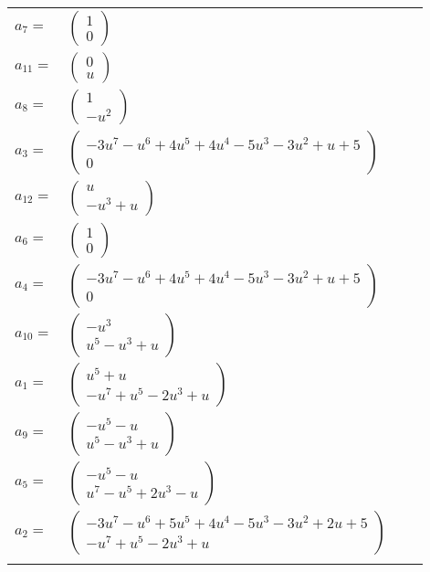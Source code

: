 \documentclass[1p]{elsarticle_modified}
\theoremstyle{definition}
\begin{document}
\begin{tabular}{m{7pt} m{180pt} m{7pt} m{180pt} }
\flushright $a_{7}=$&$\begin{pmatrix}1\\0\end{pmatrix}$ \\
\flushright $a_{11}=$&$\begin{pmatrix}0\\u\end{pmatrix}$ \\
\flushright $a_{8}=$&$\begin{pmatrix}1\\- u^2\end{pmatrix}$ \\
\flushright $a_{3}=$&$\begin{pmatrix}-3 u^7- u^6+4 u^5+4 u^4-5 u^3-3 u^2+u+5\\0\end{pmatrix}$ \\
\flushright $a_{12}=$&$\begin{pmatrix}u\\- u^3+u\end{pmatrix}$ \\
\flushright $a_{6}=$&$\begin{pmatrix}1\\0\end{pmatrix}$ \\
\flushright $a_{4}=$&$\begin{pmatrix}-3 u^7- u^6+4 u^5+4 u^4-5 u^3-3 u^2+u+5\\0\end{pmatrix}$ \\
\flushright $a_{10}=$&$\begin{pmatrix}- u^3\\u^5- u^3+u\end{pmatrix}$ \\
\flushright $a_{1}=$&$\begin{pmatrix}u^5+u\\- u^7+u^5-2 u^3+u\end{pmatrix}$ \\
\flushright $a_{9}=$&$\begin{pmatrix}- u^5- u\\u^5- u^3+u\end{pmatrix}$ \\
\flushright $a_{5}=$&$\begin{pmatrix}- u^5- u\\u^7- u^5+2 u^3- u\end{pmatrix}$ \\
\flushright $a_{2}=$&$\begin{pmatrix}-3 u^7- u^6+5 u^5+4 u^4-5 u^3-3 u^2+2 u+5\\- u^7+u^5-2 u^3+u\end{pmatrix}$\\&\end{tabular}
\end{document}
